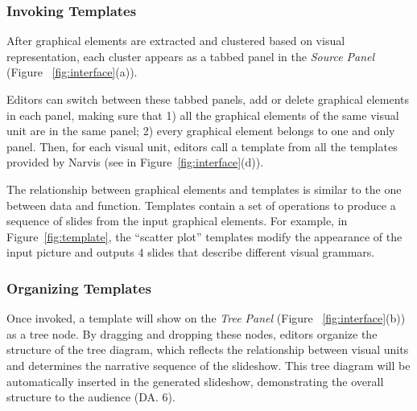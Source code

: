 \subsubsection{Invoking Templates} 

After graphical elements are extracted and clustered based on visual representation, each cluster appears as a tabbed panel in the \textit{Source Panel} (Figure ~\ref{fig:interface}(a)). 

Editors can switch between these tabbed panels, add or delete graphical elements in each panel, making sure that 1) all the graphical elements of the same visual unit are in the same panel; 2) every graphical element belongs to one and only panel. Then, for each visual unit, editors call a template from all the templates provided by Narvis (see in Figure~\ref{fig:interface}(d)). 

The relationship between graphical elements and templates is similar to the one between data and function. Templates contain a set of operations to produce a sequence of slides from the input graphical elements. For example, in Figure~\ref{fig:template}, the ``scatter plot'' templates modify the appearance of the input picture and outputs 4 slides that describe different visual grammars. 

\subsubsection{Organizing Templates} 
Once invoked, a template will show on the \textit{Tree Panel} (Figure ~\ref{fig:interface}(b)) as a tree node. 
By dragging and dropping these nodes, editors organize the structure of the tree diagram, which reflects the relationship between visual units and determines the narrative sequence of the slideshow. This tree diagram will be automatically inserted in the generated slideshow, demonstrating the overall structure to the audience (DA. 6). 


